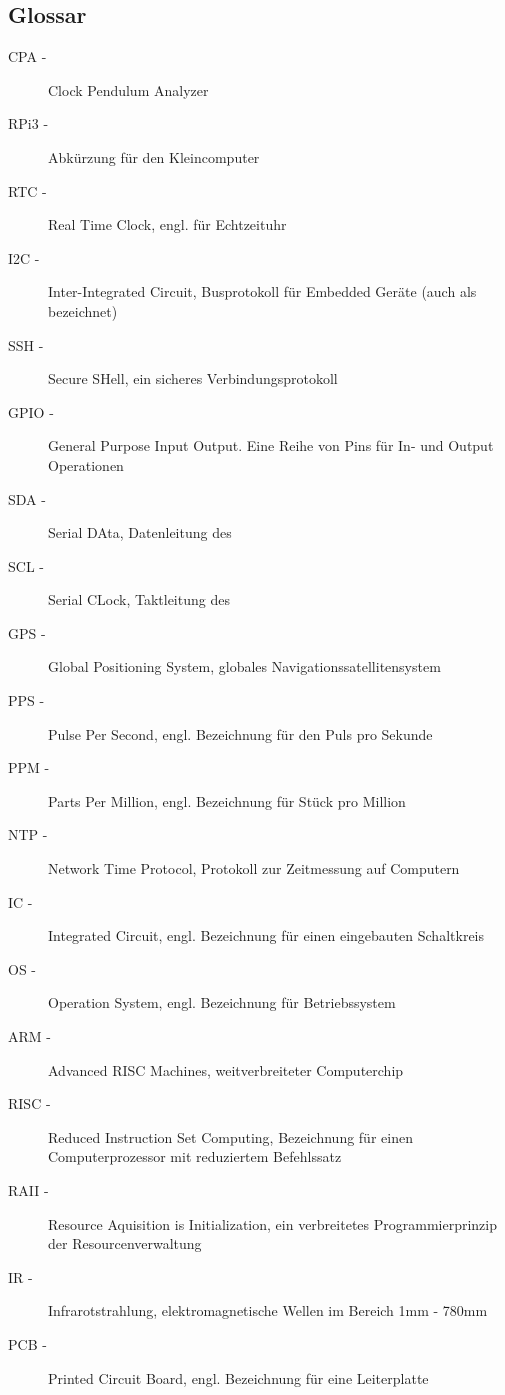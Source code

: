         \clearpage
		\subsection{Glossar}
			\begin{description}
				\item[CPA -] Clock Pendulum Analyzer
                \item[RPi3 -] Abkürzung für den Kleincomputer \rpi
                \item[RTC -] Real Time Clock, engl. für Echtzeituhr
                \item[I2C -] Inter-Integrated Circuit, Busprotokoll für Embedded Geräte (auch als \iic bezeichnet)
                \item[SSH -] Secure SHell, ein sicheres Verbindungsprotokoll
                \item[GPIO -] General Purpose Input Output. Eine Reihe von Pins für In- und Output Operationen
                \item[SDA -] Serial DAta, Datenleitung des \iic
                \item[SCL -] Serial CLock, Taktleitung des \iic
                \item[GPS -] Global Positioning System, globales Navigationssatellitensystem
                \item[PPS -] Pulse Per Second, engl. Bezeichnung für den Puls pro Sekunde
                \item[PPM -] Parts Per Million, engl. Bezeichnung für Stück pro Million
                \item[NTP -] Network Time Protocol, Protokoll zur Zeitmessung auf Computern
                \item[IC -] Integrated Circuit, engl. Bezeichnung für einen eingebauten Schaltkreis
                \item[OS -] Operation System, engl. Bezeichnung für Betriebssystem
                \item[ARM -] Advanced RISC Machines, weitverbreiteter Computerchip
                \item[RISC -] Reduced Instruction Set Computing, Bezeichnung für einen Computerprozessor mit reduziertem Befehlssatz
                \item[RAII -] Resource Aquisition is Initialization, ein verbreitetes Programmierprinzip der Resourcenverwaltung
                \item[IR -] Infrarotstrahlung,  elektromagnetische Wellen im Bereich 1mm - 780mm
                \item[PCB -] Printed Circuit Board, engl. Bezeichnung für eine Leiterplatte

\end{description}
